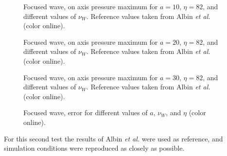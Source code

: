 \begin{figure}[htb] 
\centering 
{} 
\caption{Focused wave, on axis pressure maximum for $a=10$, $\eta=82$, and different values of $\nu_W$. Reference values taken from Albin {\em et al.} \citep{albin} (color online).}
\label{fig:hifu-u1max-a10}
\end{figure}
\begin{figure}[htb] 
\centering 
{} 
\caption{Focused wave, on axis pressure maximum for $a=20$, $\eta=82$, and different values of $\nu_W$. Reference values taken from Albin {\em et al.} \citep{albin} (color online).}
\label{fig:hifu-u1max-a20}
\end{figure}
\begin{figure}[htb] 
\centering 
{} 
\caption{Focused wave, on axis pressure maximum for $a=30$, $\eta=82$, and different values of $\nu_W$. Reference values taken from Albin {\em et al.} \citep{albin} (color online).}
\label{fig:hifu-u1max-a30}
\end{figure}
\begin{figure}[htb] 
\centering 
{} 
\caption{Focused wave, error for different values of $a$, $\nu_W$, and $\eta$ (color online).}
\label{fig:hifu-error}
\end{figure}

For this second test the results of Albin {\em et al.} \citep{albin} were used as reference, and simulation conditions were reproduced as closely as possible.

